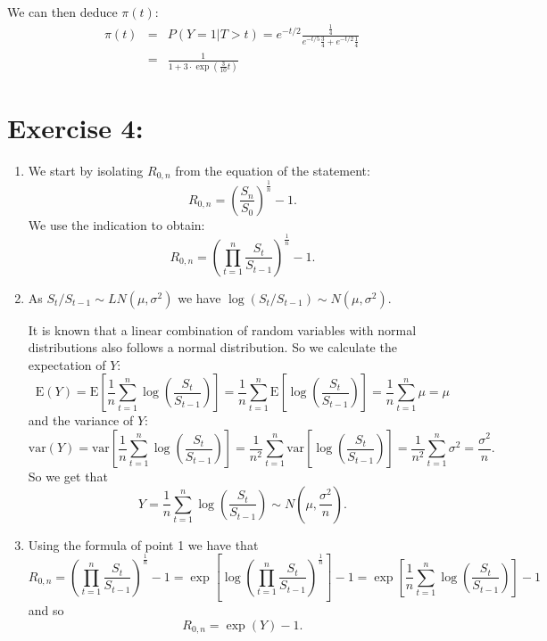 \documentclass[12pt,thmsa]{article}
\begin{document}
\begin{enumerate}
\begin{enumerate}
We can then deduce $\pi(t)$:
  \begin{eqnarray*}
  \pi(t)&=& P(Y=1\vert T> t) = e^{-t/2} \frac{\frac{1}{4}}{ e^{-t/5} \frac{3}{4} +e^{-t/2}\frac{1}{4}}  \\
  &=& \frac{1}{1+3 \cdot \exp(\frac{3}{10}t)}
\end{eqnarray*}



\end{enumerate}

\newpage

\section*{Exercise 4:}

\begin{enumerate}
  \item We start by isolating $R_{0,n}$ from the equation of the statement:
\begin{equation*}
    R_{0,n}=\left( \frac{S_n}{S_0}\right)^{\frac{1}{n}} -1.
\end{equation*}
We use the indication to obtain:
\begin{equation*}
 R_{0,n}=\left( \prod_{t=1}^{n} \frac{S_t}{S_{t-1}} \right)^{\frac{1}{n}} -1.
\end{equation*}

  \item As $S_t/S_{t-1} \sim LN(\mu, \sigma^2)$ we have $\log(S_t/S_{t-1}) \sim N(\mu, \sigma^2)$.
\smallskip

It is known that a linear combination of random variables with normal distributions also follows a normal distribution. So we calculate the expectation of $Y$:
\begin{equation*}
 \text{E}(Y)=\text{E}\left[\frac{1}{n} \sum_{t=1}^n \log\left(\frac{S_t}{S_{t-1}}\right)\right]  = \frac{1}{n} \sum_{t=1}^n \text{E}\left[\log\left(\frac{S_t}{S_{t-1}}\right)\right] = \frac{1}{n} \sum_{t=1}^n \mu = \mu
\end{equation*}
  and the variance of $Y$:
  \begin{equation*}
   \text{var}(Y)=\text{var}\left[\frac{1}{n} \sum_{t=1}^n \log\left(\frac{S_t}{S_{t-1}}\right)\right]  = \frac{1}{n^2} \sum_{t=1}^n \text{var}\left[\log\left(\frac{S_t}{S_{t-1}}\right)\right] = \frac{1}{n^2} \sum_{t=1}^n \sigma^2 = \frac{\sigma^2}{n}.
  \end{equation*}
  So we get that $$Y=\frac{1}{n} \sum_{t=1}^n \log\left(\frac{S_t}{S_{t-1}}\right) \sim N\left(\mu,\frac{\sigma^2}{n}\right).$$
  \item
Using the formula of point 1 we have that
$$
 R_{0,n}=\left( \prod_{t=1}^{n} \frac{S_t}{S_{t-1}} \right)^{\frac{1}{n}}
 -1=\exp\left[\log\left(\prod_{t=1}^{n}
 \frac{S_t}{S_{t-1}}\right)^{\frac{1}{n}}\right]  -1=\exp\left[\frac{1}{n}
 \sum_{t=1}^{n} \log\left( \frac{S_t}{S_{t-1}} \right) \right]-1 %
$$
and so
$$
 R_{0,n}= \exp(Y)-1.
$$


\end{enumerate}
\end{enumerate}
\end{document}
